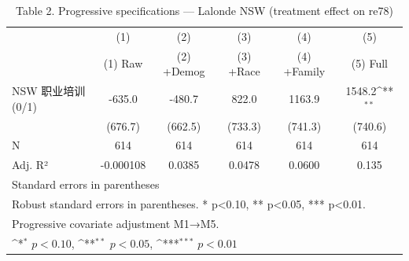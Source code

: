 \begin{table}[htbp]\centering
\def\sym#1{\ifmmode^{#1}\else\(^{#1}\)\fi}
\caption{Table 2. Progressive specifications — Lalonde NSW (treatment effect on re78)}
\begin{tabular}{l*{5}{c}}
\toprule
                    &\multicolumn{1}{c}{(1)}&\multicolumn{1}{c}{(2)}&\multicolumn{1}{c}{(3)}&\multicolumn{1}{c}{(4)}&\multicolumn{1}{c}{(5)}\\
                    &\multicolumn{1}{c}{(1) Raw}&\multicolumn{1}{c}{(2) +Demog}&\multicolumn{1}{c}{(3) +Race}&\multicolumn{1}{c}{(4) +Family}&\multicolumn{1}{c}{(5) Full}\\
\midrule
NSW 职业培训 (0/1)  &      -635.0         &      -480.7         &       822.0         &      1163.9         &      1548.2\sym{**} \\
                    &     (676.7)         &     (662.5)         &     (733.3)         &     (741.3)         &     (740.6)         \\
\midrule
N                   &         614         &         614         &         614         &         614         &         614         \\
Adj. R²             &   -0.000108         &      0.0385         &      0.0478         &      0.0600         &       0.135         \\
\bottomrule
\multicolumn{6}{l}{\footnotesize Standard errors in parentheses}\\
\multicolumn{6}{l}{\footnotesize Robust standard errors in parentheses. * p<0.10, ** p<0.05, *** p<0.01.}\\
\multicolumn{6}{l}{\footnotesize Progressive covariate adjustment M1→M5.}\\
\multicolumn{6}{l}{\footnotesize \sym{*} \(p<0.10\), \sym{**} \(p<0.05\), \sym{***} \(p<0.01\)}\\
\end{tabular}
\end{table}
